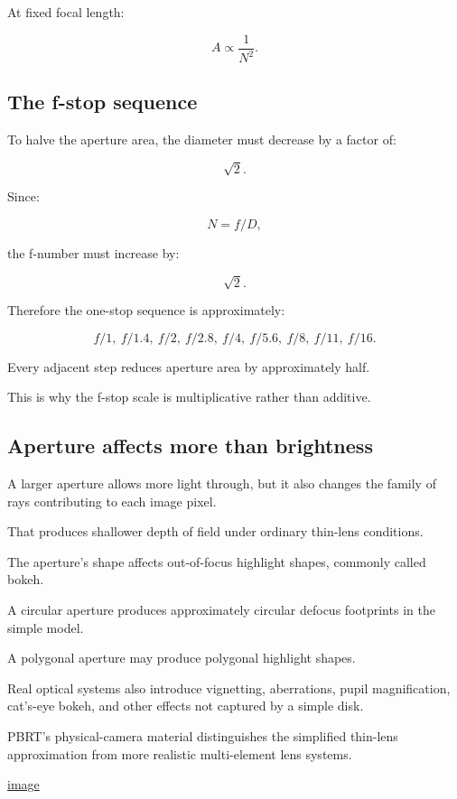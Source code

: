 At fixed focal length:

\[ A\propto\frac1{N^2}. \]

\subsection{The f-stop sequence}\label{02-foundations-ii-ch036-the-f-stop-sequence}

To halve the aperture area, the diameter must decrease by a factor of:

\[ \sqrt2. \]

Since:

\[ N=f/D, \]

the f-number must increase by:

\[ \sqrt2. \]

Therefore the one-stop sequence is approximately:

\[ \boxed{ f/1,\ f/1.4,\ f/2,\ f/2.8,\ f/4,\ f/5.6,\ f/8,\ f/11,\ f/16. } \]

Every adjacent step reduces aperture area by approximately half.

This is why the f-stop scale is multiplicative rather than additive.

\subsection{Aperture affects more than brightness}\label{02-foundations-ii-ch036-aperture-affects-more-than-brightness}

A larger aperture allows more light through, but it also changes the family of rays contributing to each image pixel.

That produces shallower depth of field under ordinary thin-lens conditions.

The aperture's shape affects out-of-focus highlight shapes, commonly called bokeh.

A circular aperture produces approximately circular defocus footprints in the simple model.

A polygonal aperture may produce polygonal highlight shapes.

Real optical systems also introduce vignetting, aberrations, pupil magnification, cat's-eye bokeh, and other effects not captured by a simple disk.

PBRT's physical-camera material distinguishes the simplified thin-lens approximation from more realistic multi-element lens systems. 

\href{https://www.google.com/s2/favicons?domain=https://www.pbr-book.org&sz=32}{image}

